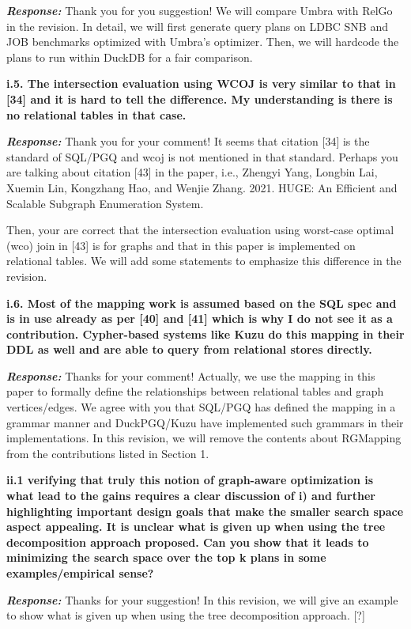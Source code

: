 \textbf{\textit{Response: }}
Thank you for you suggestion! We will compare Umbra with RelGo in the revision. In detail, we will first generate query plans on LDBC SNB and JOB benchmarks optimized with Umbra's optimizer. Then, we will hardcode the plans to run within DuckDB for a fair comparison.


\textbf{
i.5. The intersection evaluation using WCOJ is very similar to that in [34] and it is hard to tell the difference. My understanding is there is no relational tables in that case.}

\textbf{\textit{Response: }}
Thank you for your comment! It seems that citation [34] is the standard of SQL/PGQ and wcoj is not mentioned in that standard.
Perhaps you are talking about citation [43] in the paper, i.e., Zhengyi Yang, Longbin Lai, Xuemin Lin, Kongzhang Hao, and Wenjie Zhang.
2021. HUGE: An Efficient and Scalable Subgraph Enumeration System.

Then, your are correct that the intersection evaluation using worst-case optimal (wco) join in [43] is for graphs and that in this paper is implemented on relational tables.
We will add some statements to emphasize this difference in the revision.


\textbf{
i.6. Most of the mapping work is assumed based on the SQL spec and is in use already as per [40] and [41] which is why I do not see it as a contribution. Cypher-based systems like Kuzu do this mapping in their DDL as well and are able to query from relational stores directly.}

\textbf{\textit{Response: }}
Thanks for your comment! Actually, we use the mapping in this paper to formally define the relationships between relational tables and graph vertices/edges. We agree with you that SQL/PGQ has defined the mapping in a grammar manner and DuckPGQ/Kuzu have implemented such grammars in their implementations. In this revision, we will remove the contents about RGMapping from the contributions listed in Section 1.

\textbf{
ii.1 verifying that truly this notion of graph-aware optimization is what lead to the gains requires a clear discussion of i) and further highlighting important design goals that make the smaller search space aspect appealing.
It is unclear what is given up when using the tree decomposition approach proposed. Can you show that it leads to minimizing the search space over the top k plans in some examples/empirical sense?}

\textbf{\textit{Response: }}
Thanks for your suggestion! In this revision, we will give an example to show what is given up when using the tree decomposition approach. [?]


